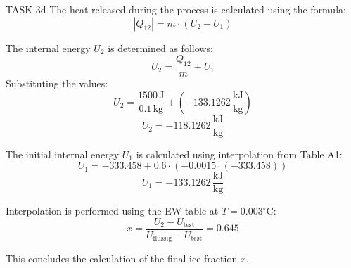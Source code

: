TASK 3d  
The heat released during the process is calculated using the formula:  
\[
|Q_{12}| = m \cdot (U_2 - U_1)
\]  

The internal energy \( U_2 \) is determined as follows:  
\[
U_2 = \frac{Q_{12}}{m} + U_1
\]  
Substituting the values:  
\[
U_2 = \frac{1500 \, \text{J}}{0.1 \, \text{kg}} + (-133.1262 \, \frac{\text{kJ}}{\text{kg}})
\]  
\[
U_2 = -118.1262 \, \frac{\text{kJ}}{\text{kg}}
\]  

The initial internal energy \( U_1 \) is calculated using interpolation from Table A1:  
\[
U_1 = -333.458 + 0.6 \cdot (-0.0015 \cdot (-333.458))
\]  
\[
U_1 = -133.1262 \, \frac{\text{kJ}}{\text{kg}}
\]  

Interpolation is performed using the EW table at \( T = 0.003^\circ \text{C} \):  
\[
x = \frac{U_2 - U_{\text{test}}}{U_{\text{flüssig}} - U_{\text{test}}} = 0.645
\]  

This concludes the calculation of the final ice fraction \( x \).